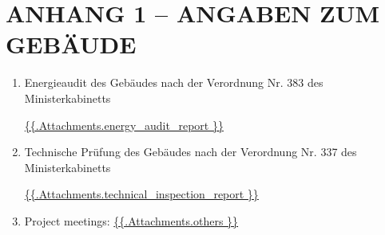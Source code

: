 \section{ANHANG 1 – ANGABEN ZUM GEBÄUDE}
\begin{enumerate}
\item {Energieaudit des Gebäudes nach der Verordnung Nr. 383 des Ministerkabinetts}

\url{ {{.Attachments.energy_audit_report }} }

\iffalse attachment value="energy audit report" \fi


\item {Technische Prüfung des Gebäudes nach der Verordnung Nr. 337 des Ministerkabinetts}

\url{ {{.Attachments.technical_inspection_report }} }

\iffalse attachment value="technical inspection report" \fi

	\item Project meetings:
          \url{ {{.Attachments.others }} }
          \iffalse attachment value="others" \fi


\end{enumerate}
